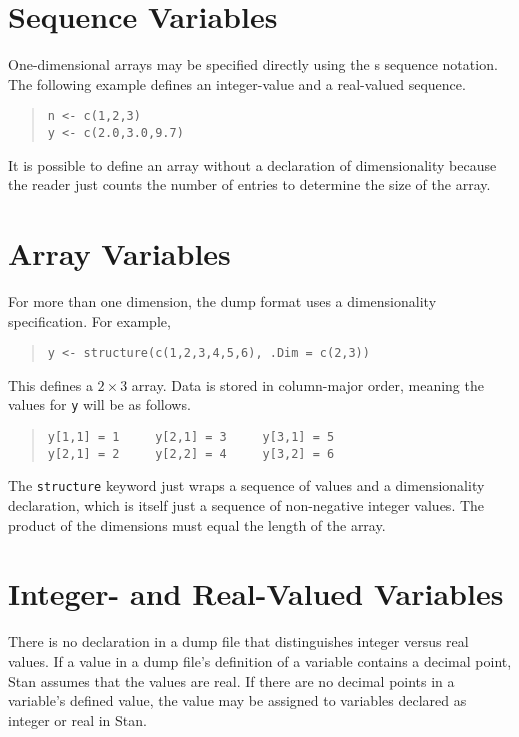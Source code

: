 \documentclass[10pt]{report}
\newcommand{\Stan}{Stan\xspace}
\newcommand{\acronym}[1]{{\sc #1}\xspace}
\newcommand{\SPLUS}{\acronym{s}}
\newcommand{\code}[1]{{\tt #1}}
\begin{document}
\section{Sequence Variables}

One-dimensional arrays may be specified directly using the \SPLUS
sequence notation.  The following example defines an integer-value and
a real-valued sequence.
%
\begin{quote}
\begin{Verbatim}
n <- c(1,2,3)
y <- c(2.0,3.0,9.7)
\end{Verbatim}
\end{quote}
%
It is possible to define an array without a declaration of
dimensionality because the reader just counts the number of entries to
determine the size of the array.

\section{Array Variables}

For more than one dimension, the dump format uses a dimensionality
specification.  For example,
%
\begin{quote}
\begin{verbatim}
y <- structure(c(1,2,3,4,5,6), .Dim = c(2,3))
\end{verbatim}
\end{quote}
%
This defines a $2 \times 3$ array.  Data is stored in column-major
order, meaning the values for \code{y} will be as follows.
%
\begin{quote}
\begin{Verbatim}
y[1,1] = 1     y[2,1] = 3     y[3,1] = 5    
y[2,1] = 2     y[2,2] = 4     y[3,2] = 6
\end{Verbatim}
\end{quote}
%
The \code{structure} keyword just wraps a sequence of values and a
dimensionality declaration, which is itself just a sequence of
non-negative integer values.  The product of the dimensions must equal
the length of the array.


\section{Integer- and Real-Valued Variables}

There is no declaration in a dump file that distinguishes integer
versus real values.  If a value in a dump file's definition of a
variable contains a decimal point, \Stan assumes that the values are
real.  If there are no decimal points in a variable's defined value, 
the value may be assigned to variables declared as integer or real
in \Stan.
\end{document}
